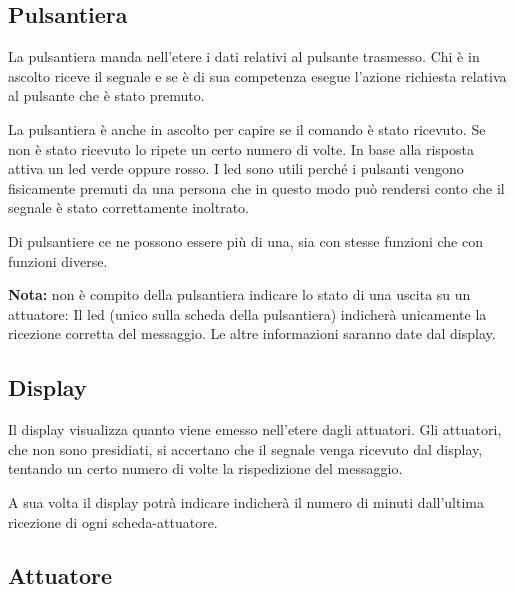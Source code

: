 \documentclass[italian]{article}
\begin{document}
	\subsection*{Pulsantiera}
	
	La pulsantiera manda nell'etere i dati relativi al pulsante trasmesso. Chi è in ascolto riceve il segnale e se è di sua competenza esegue l'azione richiesta relativa al pulsante che è stato premuto.
	
	La pulsantiera è anche in ascolto per capire se il comando è stato ricevuto. Se non è stato ricevuto lo ripete un certo numero di volte. In base alla risposta attiva un led verde oppure rosso. I led sono utili perché i pulsanti vengono fisicamente premuti da una persona che in questo modo può rendersi conto che il segnale è stato correttamente inoltrato.
	
	Di pulsantiere ce ne possono essere più di una, sia con stesse funzioni che con funzioni diverse.
	
	\bigskip
	
	\textbf{Nota:} non è compito della pulsantiera indicare lo stato di una uscita su un attuatore: Il led (unico sulla scheda della pulsantiera) indicherà unicamente la ricezione corretta del messaggio. Le altre informazioni saranno date dal display.
	
	\subsection*{Display}
	
	Il display visualizza quanto viene emesso nell'etere dagli attuatori. {\scriptsize Gli attuatori, che non sono presidiati, si accertano che il segnale venga ricevuto dal display, tentando un certo numero di volte la rispedizione del messaggio.}
	
	A sua volta il display potrà indicare indicherà il numero di minuti dall'ultima ricezione di ogni scheda-attuatore.
    
%    
    
    \subsection*{Attuatore}
    
\end{document}
